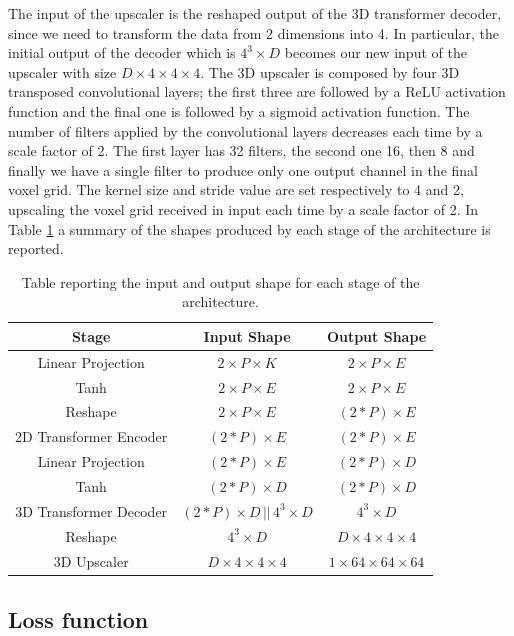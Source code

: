 \documentclass[binding=0.6cm,noexaminfo]{sapthesis}
\begin{document}
The input of the upscaler is the reshaped output of the 3D transformer decoder, since we need to transform the data from 2 dimensions into 4. In particular, the initial output of the decoder which is $4^3 \times D$ becomes our new input of the upscaler with size $D \times 4 \times 4 \times 4$.
The 3D upscaler is composed by four 3D transposed convolutional layers; the first three are followed by a ReLU activation function and the final one is followed by a sigmoid activation function. The number of filters applied by the convolutional layers decreases each time by a scale factor of 2. The first layer has 32 filters, the second one 16, then 8 and finally we have a single filter to produce only one output channel in the final voxel grid. The kernel size and stride value are set respectively to 4 and 2, upscaling the voxel grid received in input each time by a scale factor of 2. In Table \ref{tab:shapes} a summary of the shapes produced by each stage of the architecture is reported.

\begin{table}[h!]
\centering
\begin{tabular}{|c|c|c|}
\hline
Stage & Input Shape & Output Shape \\
\hline\hline
Linear Projection & $2 \times P \times K$ & $2 \times P \times E$ \\
\hline
Tanh & $2 \times P \times E$ & $2 \times P \times E$ \\
\hline
Reshape & $2 \times P \times E$ & $(2 * P) \times E$ \\
\hline
2D Transformer Encoder & $(2 * P) \times E$ & $(2 * P) \times E$ \\
\hline
Linear Projection & $(2 * P) \times E$ & $(2 * P) \times D$ \\
\hline
Tanh & $(2 * P) \times D$ & $(2 * P) \times D$ \\
\hline
3D Transformer Decoder & $(2 * P) \times D \, || \, 4^3 \times D$ & $4^3 \times D$ \\
\hline
Reshape & $4^3 \times D$ & $D \times 4 \times 4 \times 4$ \\
\hline
3D Upscaler & $D \times 4 \times 4 \times 4$ & $1 \times 64 \times 64 \times 64$ \\
\hline
\end{tabular}
\caption{Table reporting the input and output shape for each stage of the architecture.}
\label{tab:shapes}
\end{table}

\subsection{Loss function}
\end{document}

